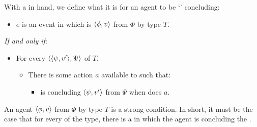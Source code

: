 \begin{note}
  With a \torN{} in hand, we define what it is for an agent to be `' concluding:

  \begin{definition}[\ptC{2}]
    \label{def:ptC}

    \noindent%

    \begin{itemize}
    \item
      \(e\) is an event in which \vAgent{} is \emph{} \(\langle \phi, v \rangle\) from \(\Phi\) by type \(T\).
    \end{itemize}

    \emph{If and only if}:

    \begin{itemize}
    \item
      For every \tI{} \(\langle \langle \psi, v' \rangle, \Psi \rangle\) of \(T\).
      \begin{itemize}
      \item
        There is some action \(a\) available to \vAgent{} such that:
        \begin{itemize}
        \item
          \vAgent{} is concluding \(\langle \psi, v' \rangle\) from \(\Psi\) when \vAgent{} does \(a\).
        \end{itemize}
      \end{itemize}
    \end{itemize}
    \vspace{-\baselineskip}
  \end{definition}

  \noindent%
  An agent  \(\langle \phi, v \rangle\) from \(\Phi\) by type \(T\) is a strong condition.
  In short, it must be the case that for every \tI{} of the type, there is a \pevent{} in which the agent is concluding the \tI{}.
\end{note}

